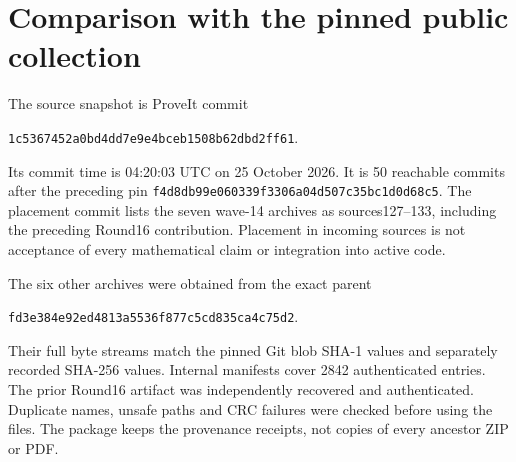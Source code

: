 \section{Comparison with the pinned public collection}
The source snapshot is ProveIt commit
\begin{center}\small\nolinkurl{1c5367452a0bd4dd7e9e4bceb1508b62dbd2ff61}.\end{center}
Its commit time is 04:20:03 UTC on 25 October 2026. It is 50 reachable commits after the preceding pin \nolinkurl{f4d8db99e060339f3306a04d507c35bc1d0d68c5}. The placement commit lists the seven wave-14 archives as sources127--133, including the preceding Round16 contribution. Placement in incoming sources is not acceptance of every mathematical claim or integration into active code.

The six other archives were obtained from the exact parent\begin{center}\small\nolinkurl{fd3e384e92ed4813a5536f877c5cd835ca4c75d2}.\end{center}Their full byte streams match the pinned Git blob SHA-1 values and separately recorded SHA-256 values. Internal manifests cover 2842 authenticated entries. The prior Round16 artifact was independently recovered and authenticated. Duplicate names, unsafe paths and CRC failures were checked before using the files. The package keeps the provenance receipts, not copies of every ancestor ZIP or PDF.

